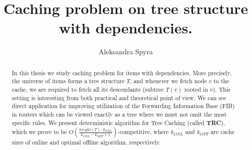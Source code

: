 \documentclass[a4paper,10pt]{article}
\title{Caching problem on tree structure with dependencies.}
\author{Aleksandra Spyra}
\begin{document}
\maketitle

\begin{abstract}
In this thesis we study caching problem for items with dependencies.
More precisely, the universe of items forms a tree structure $T$, and whenever
we fetch node $v$ to the cache, we are required to fetch all its descendants
(subtree $T(v)$ rooted in $v$). This setting is interesting from both practical 
and theoretical point of view. We can see direct application for improving 
utilization of the Forwarding Information Base (FIB) in routers which can be 
viewed exactly as a tree where we must not omit the most specific rules. We 
present deterministic algorithm for Tree Caching (called \textbf{TRC}), which 
we 
prove to be $O(\frac{height(T) \cdot k_{ONL}}{k_{ONL} - k_{OPT} + 
1})$-competitive, 
where $k_{ONL}$ and $k_{OPT}$ are cache sizes of online and optimal offline 
algorithm, respectively. 
\end{abstract}

\tableofcontents





\printbibliography
\end{document}
